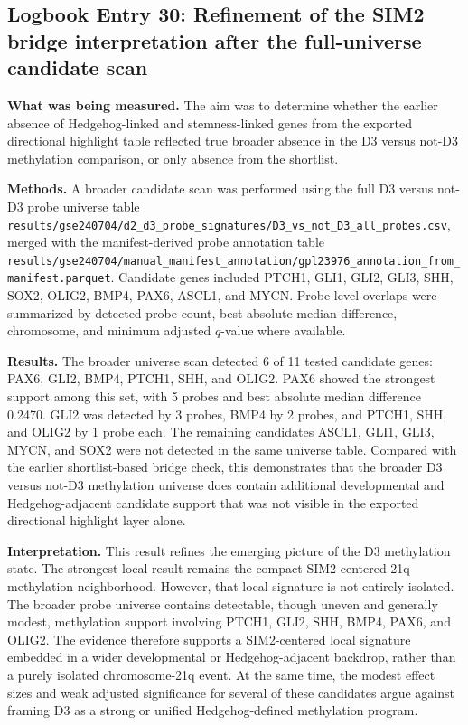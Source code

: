\subsection*{Logbook Entry 30: Refinement of the SIM2 bridge interpretation after the full-universe candidate scan}

\textbf{What was being measured.}
The aim was to determine whether the earlier absence of Hedgehog-linked and stemness-linked genes from the exported directional highlight table reflected true broader absence in the D3 versus not-D3 methylation comparison, or only absence from the shortlist.

\textbf{Methods.}
A broader candidate scan was performed using the full D3 versus not-D3 probe universe table
\texttt{results/gse240704/d2\_d3\_probe\_signatures/D3\_vs\_not\_D3\_all\_probes.csv},
merged with the manifest-derived probe annotation table
\texttt{results/gse240704/manual\_manifest\_annotation/gpl23976\_annotation\_from\_manifest.parquet}.
Candidate genes included PTCH1, GLI1, GLI2, GLI3, SHH, SOX2, OLIG2, BMP4, PAX6, ASCL1, and MYCN. Probe-level overlaps were summarized by detected probe count, best absolute median difference, chromosome, and minimum adjusted \(q\)-value where available.

\textbf{Results.}
The broader universe scan detected 6 of 11 tested candidate genes: PAX6, GLI2, BMP4, PTCH1, SHH, and OLIG2. PAX6 showed the strongest support among this set, with 5 probes and best absolute median difference 0.2470. GLI2 was detected by 3 probes, BMP4 by 2 probes, and PTCH1, SHH, and OLIG2 by 1 probe each. The remaining candidates ASCL1, GLI1, GLI3, MYCN, and SOX2 were not detected in the same universe table. Compared with the earlier shortlist-based bridge check, this demonstrates that the broader D3 versus not-D3 methylation universe does contain additional developmental and Hedgehog-adjacent candidate support that was not visible in the exported directional highlight layer alone.

\textbf{Interpretation.}
This result refines the emerging picture of the D3 methylation state. The strongest local result remains the compact SIM2-centered 21q methylation neighborhood. However, that local signature is not entirely isolated. The broader probe universe contains detectable, though uneven and generally modest, methylation support involving PTCH1, GLI2, SHH, BMP4, PAX6, and OLIG2. The evidence therefore supports a SIM2-centered local signature embedded in a wider developmental or Hedgehog-adjacent backdrop, rather than a purely isolated chromosome-21q event. At the same time, the modest effect sizes and weak adjusted significance for several of these candidates argue against framing D3 as a strong or unified Hedgehog-defined methylation program.

